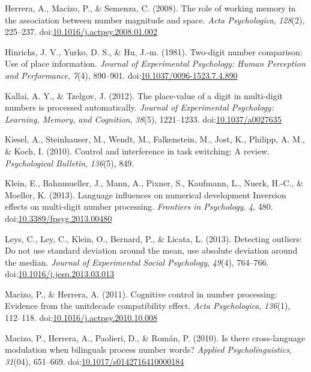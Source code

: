 \documentclass[english,man]{apa6}
\theoremstyle{definition}
\theoremstyle{definition}
\theoremstyle{definition}
\theoremstyle{remark}
\begin{document}
\hypertarget{ref-herrera2008}{}
Herrera, A., Macizo, P., \& Semenza, C. (2008). The role of working
memory in the association between number magnitude and space. \emph{Acta
Psychologica}, \emph{128}(2), 225--237.
doi:\href{https://doi.org/10.1016/j.actpsy.2008.01.002}{10.1016/j.actpsy.2008.01.002}

\hypertarget{ref-hinrichs1981}{}
Hinrichs, J. V., Yurko, D. S., \& Hu, J.-m. (1981). Two-digit number
comparison: Use of place information. \emph{Journal of Experimental
Psychology: Human Perception and Performance}, \emph{7}(4), 890--901.
doi:\href{https://doi.org/10.1037/0096-1523.7.4.890}{10.1037/0096-1523.7.4.890}

\hypertarget{ref-kallai2012}{}
Kallai, A. Y., \& Tzelgov, J. (2012). The place-value of a digit in
multi-digit numbers is processed automatically. \emph{Journal of
Experimental Psychology: Learning, Memory, and Cognition}, \emph{38}(5),
1221--1233.
doi:\href{https://doi.org/10.1037/a0027635}{10.1037/a0027635}

\hypertarget{ref-kiesel2010}{}
Kiesel, A., Steinhauser, M., Wendt, M., Falkenstein, M., Jost, K.,
Philipp, A. M., \& Koch, I. (2010). Control and interference in task
switching: A review. \emph{Psychological Bulletin}, \emph{136}(5), 849.

\hypertarget{ref-klein2013}{}
Klein, E., Bahnmueller, J., Mann, A., Pixner, S., Kaufmann, L., Nuerk,
H.-C., \& Moeller, K. (2013). Language influences on numerical
development Inversion effects on multi-digit number processing.
\emph{Frontiers in Psychology}, \emph{4}, 480.
doi:\href{https://doi.org/10.3389/fpsyg.2013.00480}{10.3389/fpsyg.2013.00480}

\hypertarget{ref-leys2013}{}
Leys, C., Ley, C., Klein, O., Bernard, P., \& Licata, L. (2013).
Detecting outliers: Do not use standard deviation around the mean, use
absolute deviation around the median. \emph{Journal of Experimental
Social Psychology}, \emph{49}(4), 764--766.
doi:\href{https://doi.org/10.1016/j.jesp.2013.03.013}{10.1016/j.jesp.2013.03.013}

\hypertarget{ref-macizo2011}{}
Macizo, P., \& Herrera, A. (2011). Cognitive control in number
processing: Evidence from the unitdecade compatibility effect.
\emph{Acta Psychologica}, \emph{136}(1), 112--118.
doi:\href{https://doi.org/10.1016/j.actpsy.2010.10.008}{10.1016/j.actpsy.2010.10.008}

\hypertarget{ref-macizo2010}{}
Macizo, P., Herrera, A., Paolieri, D., \& Román, P. (2010). Is there
cross-language modulation when bilinguals process number words?
\emph{Applied Psycholinguistics}, \emph{31}(04), 651--669.
doi:\href{https://doi.org/10.1017/s0142716410000184}{10.1017/s0142716410000184}
\end{document}
